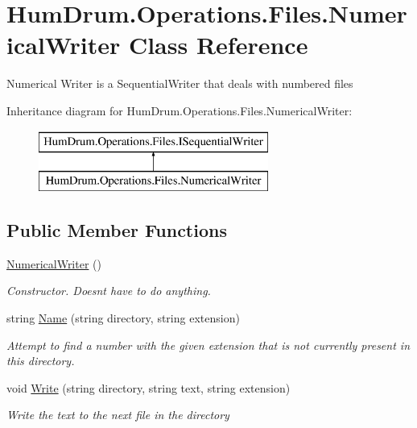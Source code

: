 \hypertarget{classHumDrum_1_1Operations_1_1Files_1_1NumericalWriter}{}\section{Hum\+Drum.\+Operations.\+Files.\+Numerical\+Writer Class Reference}
\label{classHumDrum_1_1Operations_1_1Files_1_1NumericalWriter}


Numerical Writer is a Sequential\+Writer that deals with numbered files  


Inheritance diagram for Hum\+Drum.\+Operations.\+Files.\+Numerical\+Writer\+:\begin{figure}[H]
\begin{center}
\leavevmode
\includegraphics[height=2.000000cm]{classHumDrum_1_1Operations_1_1Files_1_1NumericalWriter}
\end{center}
\end{figure}
\subsection*{Public Member Functions}
\begin{DoxyCompactItemize}
\item 
\hyperlink{classHumDrum_1_1Operations_1_1Files_1_1NumericalWriter_a4c6486859c576a0bcf98c67688c3fd7f}{Numerical\+Writer} ()
\begin{DoxyCompactList}\small\item\em Constructor. Doesn\textquotesingle{}t have to do anything. \end{DoxyCompactList}\item 
string \hyperlink{classHumDrum_1_1Operations_1_1Files_1_1NumericalWriter_a101298a93b7984f57f8f52b802e3945e}{Name} (string directory, string extension)
\begin{DoxyCompactList}\small\item\em Attempt to find a number with the given extension that is not currently present in this directory. \end{DoxyCompactList}\item 
void \hyperlink{classHumDrum_1_1Operations_1_1Files_1_1NumericalWriter_a27becb60062cf9556fcb4063c0baf3af}{Write} (string directory, string text, string extension)
\begin{DoxyCompactList}\small\item\em Write the text to the next file in the directory \end{DoxyCompactList}\end{DoxyCompactItemize}


